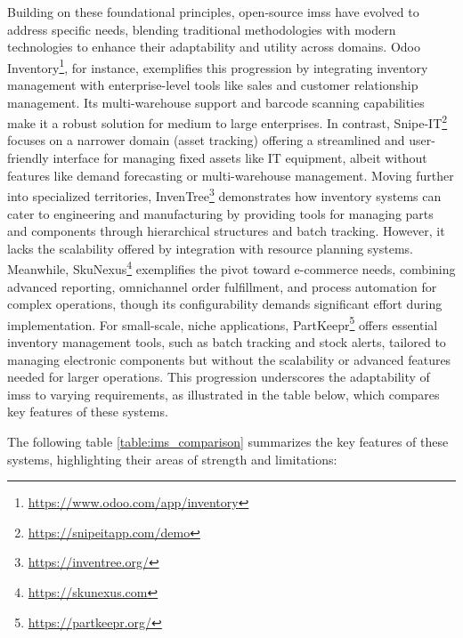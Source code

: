 Building on these foundational principles, open-source \acp{ims} have evolved to address specific needs, blending traditional methodologies with modern technologies to enhance their adaptability and utility across domains. Odoo Inventory\footnote{\url{https://www.odoo.com/app/inventory}}, for instance, exemplifies this progression by integrating inventory management with enterprise-level tools like sales and customer relationship management. Its multi-warehouse support and barcode scanning capabilities make it a robust solution for medium to large enterprises. In contrast, Snipe-IT\footnote{\url{https://snipeitapp.com/demo}} focuses on a narrower domain (asset tracking) offering a streamlined and user-friendly interface for managing fixed assets like IT equipment, albeit without features like demand forecasting or multi-warehouse management. Moving further into specialized territories, InvenTree\footnote{\url{https://inventree.org/}} demonstrates how inventory systems can cater to engineering and manufacturing by providing tools for managing parts and components through hierarchical structures and batch tracking. However, it lacks the scalability offered by integration with resource planning systems. Meanwhile, SkuNexus\footnote{\url{https://skunexus.com}} exemplifies the pivot toward e-commerce needs, combining advanced reporting, omnichannel order fulfillment, and process automation for complex operations, though its configurability demands significant effort during implementation. For small-scale, niche applications, PartKeepr\footnote{\url{https://partkeepr.org/}} offers essential inventory management tools, such as batch tracking and stock alerts, tailored to managing electronic components but without the scalability or advanced features needed for larger operations. This progression underscores the adaptability of \acp{ims} to varying requirements, as illustrated in the table below, which compares key features of these systems.

The following table \ref{table:ims_comparison} summarizes the key features of these systems, highlighting their areas of strength and limitations:

